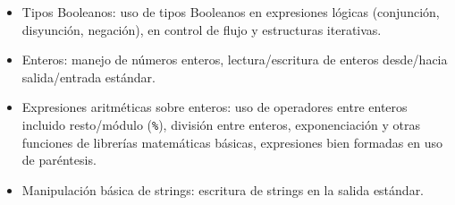 \begin{itemize}
\item[\basic] Tipos Booleanos: uso de tipos Booleanos en expresiones lógicas (conjunción, disyunción, negación), en control de flujo y estructuras iterativas.

\item[\basic] Enteros: manejo de números enteros, lectura/escritura de enteros desde/hacia salida/entrada estándar.

\item[\basic] Expresiones aritméticas sobre enteros: uso de operadores entre enteros incluido resto/módulo (\texttt{\%}),
división entre enteros, exponenciación y otras funciones de librerías matemáticas básicas, 
expresiones bien formadas en uso de paréntesis.

\item[\basic] Manipulación básica de strings: escritura de strings en la salida estándar. 

\end{itemize}


